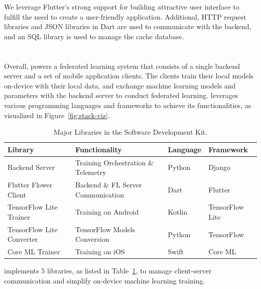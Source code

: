 We leverage Flutter's strong support for
building attractive user interface to fulfill the need to
create a user-friendly application.
Additional, HTTP request libraries and JSON libraries in Dart are used to
communicate with the backend,
and an SQL library is used to manage the cache database.

\section{\fedkit}

Overall, \fedkit powers a federated learning system that
consists of a single backend server and a set of mobile application clients.
The clients train their local models on-device with their local data,
and exchange machine learning models and parameters with the backend server to
conduct federated learning.
\fedkit leverages various programming languages and frameworks to achieve its
functionalities, as visualized in Figure~\ref{fig:stack-viz}.

\begin{table}\begin{center}
        \begin{tabular}{llll}\toprule
            Library                   & Functionality                       & Language & Framework       \\\midrule
            Backend Server            & Training Orchestration \& Telemetry & Python   & Django          \\
            Flutter Flower Client     & Backend \& FL Server Communication  & Dart     & Flutter         \\
            TensorFlow Lite Trainer   & Training on Android                 & Kotlin   & TensorFlow Lite \\
            TensorFlow Lite Converter & TensorFlow Models Conversion        & Python   & TensorFlow      \\
            Core ML Trainer           & Training on iOS                     & Swift    & Core ML         \\\bottomrule
        \end{tabular}
        \caption{Major Libraries in the \fedkit Software Development Kit.}
        \label{table:libs}
    \end{center}\end{table}

\fedkit implements 5 libraries, as listed in Table~\ref{table:libs},
to manage client-server communication and simplify on-device machine learning
training.

